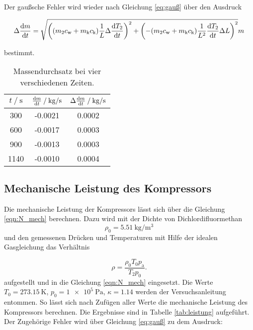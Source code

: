 Der gaußsche Fehler wird wieder nach Gleichung \eqref{eq:gauß} über den Ausdruck

\begin{equation}
    \Delta\dv{m}{t} = \sqrt{\left((m_2 c_\text{w} + m_\text{k} c_\text{k}) \frac{1}{L} \Delta \dv{T_2}{t}\right)^2 + \left(-(m_2 c_\text{w} + m_\text{k} c_\text{k}) \frac{1}{L^2} \dv{T_2}{t} \Delta L\right)^2}
    \label{eq:m_err}m
\end{equation}

bestimmt.

\begin{table}
    \centering
    \begin{tabular}{c c c}
        \toprule
        {$t \:/\: \si{\second} $}&{$ \dv{m}{t} \:/\: \si{\kilogram \per \second}$} & {$\Delta \dv{m}{t} \:/\: \si{\kilogram \per \second}$}\\
        \midrule
        300  &  -0.0021 &  0.0002   \\
        600  &  -0.0017 &  0.0003   \\
        900  &  -0.0013 &  0.0003   \\
        1140 &  -0.0010 &  0.0004   \\
        \bottomrule
    \end{tabular}
    \caption{Massendurchsatz bei vier verschiedenen Zeiten.}
    \label{tab:masse}
\end{table}


\subsection{Mechanische Leistung des Kompressors}
\label{f}

Die mechanische Leistung der Kompressors lässt sich über die Gleichung \eqref{eqn:N_mech} berechnen.
Dazu wird mit der Dichte von Dichlordifluormethan
\begin{equation}
    \rho _0 = \SI{5.51}{\kilogram \per \cubic\meter}
    \label{eq:dichte}
\end{equation}
und den gemessenen Drücken und Temperaturen mit Hilfe der idealen Gasgleichung das Verhältnis

\begin{equation}
    \rho  = \frac{\rho _0 T_0 p_\text{a}}{T_2 p_0}.
    \label{eq:dichte2}
\end{equation}
aufgestellt und in die Gleichung \eqref{eqn:N_mech} eingesetzt.
Die Werte $T_0=\SI{273.15}{\kelvin}$, $p_0=\SI{1e5}{\pascal}$, $\kappa=1.14$ werden der Versuchsanleitung \cite{V206} entommen.
So lässt sich nach Zufügen aller Werte die mechanische Leistung des Kompressors berechnen. Die Ergebnisse sind in Tabelle \ref{tab:leistung} aufgeführt. Der Zugehörige Fehler wird über Gleichung \eqref{eq:gauß}
zu dem Ausdruck:

